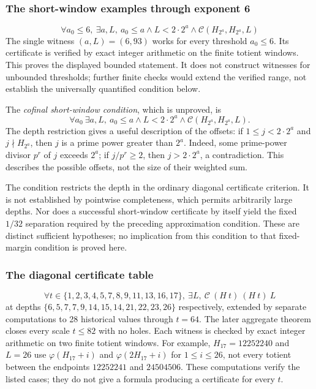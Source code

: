 \subsubsection{The short-window examples through exponent 6}

\begin{thm}\label{thm:short-window-examples-through-exponent}
\[
  \forall a_0\le 6,\ \exists a,L,\ a_0\le a \wedge L < 2\cdot 2^a \wedge
  \mathcal C(H_{2^a},H_{2^a},L)
\]
The single witness $(a,L)=(6,93)$ works for every threshold $a_0\le6$.
Its certificate is verified by exact integer arithmetic on the finite
totient windows.
This proves the displayed bounded statement. It does not construct
witnesses for unbounded thresholds; further finite checks would extend
the verified range, not establish the universally quantified condition below.
\end{thm}

\begin{defn}
The \emph{cofinal short-window condition}, which is unproved, is
\[
  \forall a_0\ \exists a,L,\ a_0\le a \wedge L < 2\cdot 2^a \wedge
  \mathcal C(H_{2^a},H_{2^a},L) .
\]
The depth restriction gives a useful description of the offsets:
if $1\le j<2\cdot2^a$ and $j\nmid H_{2^a}$, then $j$ is a prime
power greater than $2^a$. Indeed, some prime-power divisor $p^r$ of
$j$ exceeds $2^a$; if $j/p^r\ge2$, then $j>2\cdot2^a$, a contradiction.
This describes the possible offsets, not the size of their weighted sum.

The condition restricts the depth in the ordinary diagonal certificate
criterion. It is not established by pointwise completeness, which permits
arbitrarily large depths. Nor does a successful short-window certificate
by itself yield the fixed $1/32$ separation required by the preceding
approximation condition. These are distinct sufficient hypotheses;
no implication from this condition to that fixed-margin condition is
proved here.
\end{defn}

\subsubsection{The diagonal certificate table}

\begin{thm}\label{thm:diagonal-certificate-table}
\[
  \forall t\in\{1,2,3,4,5,7,8,9,11,13,16,17\},\ \exists L,\
  \mathcal{C}\ ({H}\ t)\ ({H}\ t)\ L
\]
at depths $\{6,5,7,7,9,14,15,14,21,22,23,26\}$ respectively, extended by separate
computations to 28 historical values through $t=64$.
The later aggregate theorem closes every scale $t\le82$ with no holes.
Each witness is checked by exact integer arithmetic on two finite totient
windows. For example, $H_{17}=12252240$ and $L=26$ use
$\varphi(H_{17}+i)$ and $\varphi(2H_{17}+i)$ for $1\le i\le26$,
not every totient between the endpoints $12252241$ and $24504506$.
These computations verify the listed cases; they do not give a formula
producing a certificate for every $t$.
\end{thm}

